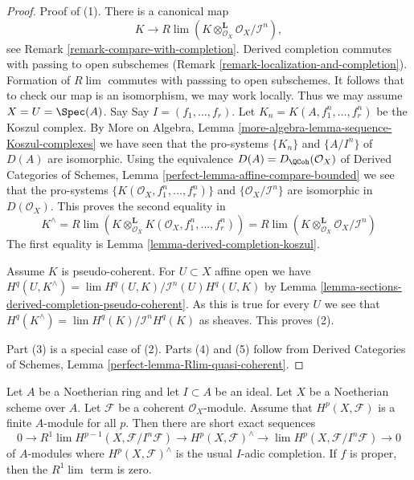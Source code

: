\begin{proof}
Proof of (1). There is a canonical map
$$
K \longrightarrow
R\lim (K \otimes_{\mathcal{O}_X}^\mathbf{L} \mathcal{O}_X/\mathcal{I}^n),
$$
see Remark \ref{remark-compare-with-completion}.
Derived completion commutes with passing to open subschemes
(Remark \ref{remark-localization-and-completion}).
Formation of $R\lim$ commutes with passsing to open subschemes.
It follows that to check our map is an isomorphism, we may work locally.
Thus we may assume $X = U = \Spec(A)$. Say
Say $I = (f_1, \ldots, f_r)$. Let
$K_n = K(A, f_1^n, \ldots, f_r^n)$ be the Koszul complex.
By More on Algebra, Lemma \ref{more-algebra-lemma-sequence-Koszul-complexes}
we have seen that the pro-systems $\{K_n\}$ and
$\{A/I^n\}$ of $D(A)$ are isomorphic.
Using the equivalence $D(A) = D_{\QCoh}(\mathcal{O}_X)$
of Derived Categories of Schemes, Lemma
\ref{perfect-lemma-affine-compare-bounded}
we see that the pro-systems $\{K(\mathcal{O}_X, f_1^n, \ldots, f_r^n)\}$
and $\{\mathcal{O}_X/\mathcal{I}^n\}$ are isomorphic in
$D(\mathcal{O}_X)$. This proves the second equality in
$$
K^\wedge = R\lim \left(
K \otimes_{\mathcal{O}_X}^\mathbf{L} K(\mathcal{O}_X, f_1^n, \ldots, f_r^n)
\right) =
R\lim (K \otimes_{\mathcal{O}_X}^\mathbf{L} \mathcal{O}_X/\mathcal{I}^n)
$$
The first equality is
Lemma \ref{lemma-derived-completion-koszul}.

\medskip\noindent
Assume $K$ is pseudo-coherent. For $U \subset X$ affine open
we have $H^q(U, K^\wedge) = \lim H^q(U, K)/\mathcal{I}^n(U)H^q(U, K)$
by Lemma \ref{lemma-sections-derived-completion-pseudo-coherent}.
As this is true for every $U$ we see that
$H^q(K^\wedge) = \lim H^q(K)/\mathcal{I}^nH^q(K)$ as sheaves.
This proves (2).

\medskip\noindent
Part (3) is a special case of (2).
Parts (4) and (5) follow from
Derived Categories of Schemes, Lemma
\ref{perfect-lemma-Rlim-quasi-coherent}.
\end{proof}

\begin{lemma}
\label{lemma-formal-functions}
Let $A$ be a Noetherian ring and let $I \subset A$ be an ideal. Let $X$ be a
Noetherian scheme over $A$. Let $\mathcal{F}$ be a coherent
$\mathcal{O}_X$-module. Assume that $H^p(X, \mathcal{F})$ is
a finite $A$-module for all $p$. Then there are short exact sequences
$$
0 \to R^1\lim H^{p - 1}(X, \mathcal{F}/I^n\mathcal{F}) \to
H^p(X, \mathcal{F})^\wedge \to \lim H^p(X, \mathcal{F}/I^n\mathcal{F}) \to 0
$$
of $A$-modules where $H^p(X, \mathcal{F})^\wedge$ is the usual $I$-adic
completion. If $f$ is proper, then the $R^1\lim$ term is zero.
\end{lemma}


